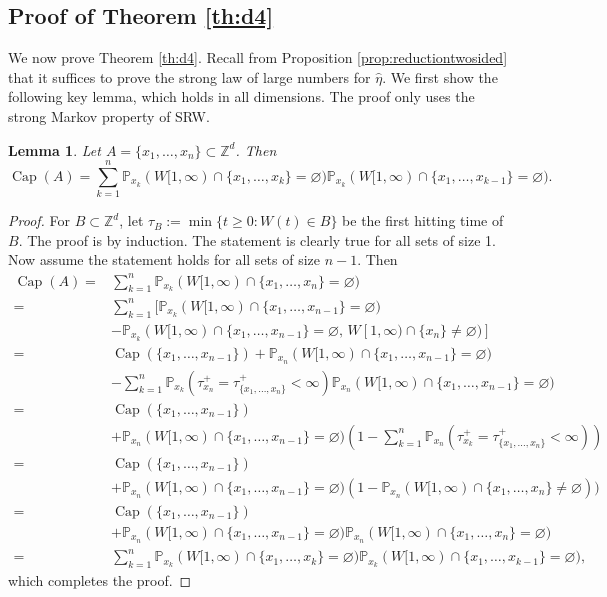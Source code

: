 \documentclass{article}
\DeclareMathOperator{\Ca}{Cap}
\newcommand{\Z}{\mathbb{Z}}
\renewcommand{\P}{\mathbb{P}}
\newcommand{\1}{\mathbf{1}}
\newcommand{\heta}{\hat\eta}
\newtheorem{lemma}[theorem]{Lemma}
\theoremstyle{definition}
\numberwithin{equation}{section}
\numberwithin{theorem}{section}
\begin{document}
\subsection{Proof of Theorem \ref{th:d4}}\label{sec:proof4}
We now prove Theorem \ref{th:d4}. Recall from Proposition \ref{prop:reductiontwosided} that it suffices to prove the strong law of large numbers for $\heta$. We first show the following key lemma, which holds in all dimensions. The proof only uses the strong Markov property of SRW.
\begin{lemma}\label{lem:capacitydecomp}
Let $A=\{x_1,\ldots,x_n\}\subset\Z^d$. Then
\begin{equation}
    \Ca(A)=\sum_{k=1}^n\P_{x_k}(W[1,\infty)\cap\{x_1,\ldots,x_k\}=\varnothing)\P_{x_k}(W[1,\infty)\cap\{x_1,\ldots,x_{k-1}\}=\varnothing).
\end{equation}
\end{lemma}
\begin{proof}
For $B\subset\Z^d$, let $\tau_B:=\min\{t\geq0\colon W(t)\in B\}$ be the first hitting time of $B$. The proof is by induction. The statement is clearly true for all sets of size 1. Now assume the statement holds for all sets of size $n-1$. Then
\begin{equation}
    \begin{split}
        \Ca(A)=&\sum_{k=1}^n\P_{x_k}(W[1,\infty)\cap\{x_1,\ldots,x_n\}=\varnothing)\\
        =&\sum_{k=1}^n[\P_{x_k}(W[1,\infty)\cap\{x_1,\ldots,x_{n-1}\}
        =\varnothing)\\
        &-\P_{x_k}(W[1,\infty)\cap\{x_1,\ldots,x_{n-1}\}=\varnothing,\,W[1,\infty)\cap\{x_n\}\neq\varnothing)]\\
        =&\Ca(\{x_1,\ldots,x_{n-1}\})+\P_{x_n}(W[1,\infty)\cap\{x_1,\ldots,x_{n-1}\}=\varnothing)\\
        &-\sum_{k=1}^n\P_{x_k}(\tau^+_{x_n}=\tau^+_{\{x_1,\ldots,x_{n}\}}<\infty)\P_{x_n}(W[1,\infty)\cap\{x_1,\ldots,x_{n-1}\}=\varnothing)\\
        =&\Ca(\{x_1,\ldots,x_{n-1}\})\\
        &+\P_{x_n}(W[1,\infty)\cap\{x_1,\ldots,x_{n-1}\}=\varnothing)\left(1-\sum_{k=1}^n\P_{x_n}(\tau_{x_k}^+=\tau_{\{x_1,\ldots,x_n\}}^+<\infty)\right)\\
        =&\Ca(\{x_1,\ldots,x_{n-1}\})\\
        &+\P_{x_n}(W[1,\infty)\cap\{x_1,\ldots,x_{n-1}\}=\varnothing)(1-\P_{x_n}(W[1,\infty)\cap\{x_1,\ldots,x_{n}\}\neq\varnothing))\\
        =&\Ca(\{x_1,\ldots,x_{n-1}\})\\
        &+\P_{x_n}(W[1,\infty)\cap\{x_1,\ldots,x_{n-1}\}=\varnothing)\P_{x_n}(W[1,\infty)\cap\{x_1,\ldots,x_{n}\}=\varnothing)\\
        =&\sum_{k=1}^n\P_{x_k}(W[1,\infty)\cap\{x_1,\ldots,x_k\}=\varnothing)\P_{x_k}(W[1,\infty)\cap\{x_1,\ldots,x_{k-1}\}=\varnothing),
    \end{split}
\end{equation}
which completes the proof.
\end{proof}
\end{document}
